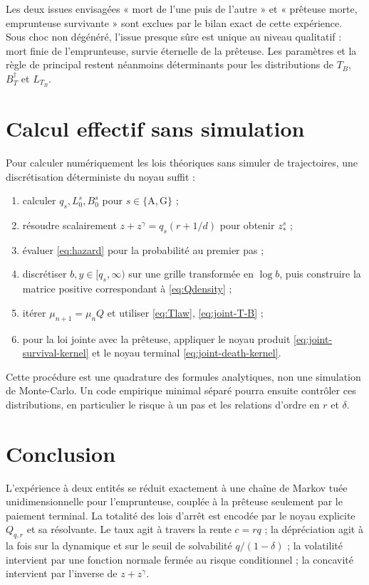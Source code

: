 \documentclass[11pt,a4paper]{article}
\newcommand{\1}{\mathbf 1}
\newcommand{\cim}{\dagger}
\theoremstyle{definition}
\theoremstyle{remark}
\begin{document}
Les deux issues envisagées « mort de l'une puis de l'autre » et
« prêteuse morte, emprunteuse survivante » sont exclues par le bilan exact
de cette expérience. Sous choc non dégénéré, l'issue presque sûre est
unique au niveau qualitatif : mort finie de l'emprunteuse, survie éternelle
de la prêteuse. Les paramètres et la règle de principal restent néanmoins
déterminants pour les distributions de $T_B$, $B_T^{\cim}$ et $L_{T_B}$.

\section{Calcul effectif sans simulation}

Pour calculer numériquement les lois théoriques sans simuler de
trajectoires, une discrétisation déterministe du noyau suffit :
\begin{enumerate}
\item calculer $q_s,L_0^s,B_0^s$ pour
$s\in\{\mathrm A,\mathrm G\}$ ;
\item résoudre scalairement
$z+z^\gamma=q_s(r+1/d)$ pour obtenir $z_*^s$ ;
\item évaluer \eqref{eq:hazard} pour la probabilité au premier pas ;
\item discrétiser $b,y\in[q_s,\infty)$ sur une grille transformée en
$\log b$, puis construire la matrice positive correspondant à
\eqref{eq:Qdensity} ;
\item itérer $\mu_{n+1}=\mu_nQ$ et utiliser
\eqref{eq:Tlaw}, \eqref{eq:joint-T-B} ;
\item pour la loi jointe avec la prêteuse, appliquer le noyau produit
\eqref{eq:joint-survival-kernel} et le noyau terminal
\eqref{eq:joint-death-kernel}.
\end{enumerate}
Cette procédure est une quadrature des formules analytiques, non une
simulation de Monte-Carlo. Un code empirique minimal séparé pourra ensuite
contrôler ces distributions, en particulier le risque à un pas et les
relations d'ordre en $r$ et $\delta$.

\section{Conclusion}

L'expérience à deux entités se réduit exactement à une chaîne de Markov
tuée unidimensionnelle pour l'emprunteuse, couplée à la prêteuse seulement
par le paiement terminal. La totalité des lois d'arrêt est encodée par le
noyau explicite $Q_{q,r}$ et sa résolvante. Le taux agit à travers la rente
$c=rq$ ; la dépréciation agit à la fois sur la dynamique et sur le seuil
de solvabilité $q/(1-\delta)$ ; la volatilité intervient par une fonction
normale fermée au risque conditionnel ; la concavité intervient par
l'inverse de $z+z^\gamma$.
\end{document}
